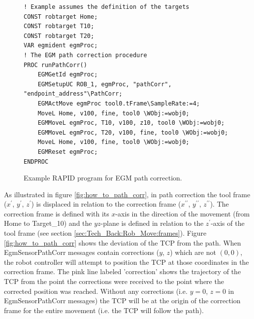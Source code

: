 \documentclass{cslthse-msc}
\begin{document}
\lstset{language=RAPID}
\begin{figure}[H]
    \centering
    \begin{lstlisting}
! Example assumes the definition of the targets
CONST robtarget Home;
CONST robtarget T10;
CONST robtarget T20;
VAR egmident egmProc;
! The EGM path correction procedure
PROC runPathCorr()
    EGMGetId egmProc;
    EGMSetupUC ROB_1, egmProc, "pathCorr", "endpoint_address"\PathCorr;
    EGMActMove egmProc tool0.tFrame\SampleRate:=4;
    MoveL Home, v100, fine, tool0 \WObj:=wobj0;
    EGMMoveL egmProc, T10, v100, z10, tool0 \WObj:=wobj0;
    EGMMoveL egmProc, T20, v100, fine, tool0 \WObj:=wobj0;
    MoveL Home, v100, fine, tool0 \WObj:=wobj0;
    EGMReset egmProc;
ENDPROC
\end{lstlisting}
\caption{Example RAPID program for EGM path correction.}
\label{fig:rapid_path_corr}
\end{figure}

As illustrated in figure \ref{fig:how_to_path_corr}, in path correction the tool frame ($x^{\prime}$, $y^{\prime}$, $z^{\prime}$) is displaced in relation to the correction frame ($x^{\prime\prime}$, $y^{\prime\prime}$, $z^{\prime\prime}$). The correction frame is defined with its $x$-axis in the direction of the movement (from Home to Target\_10) and the $yz$-plane is defined in relation to the $z^{\prime}$-axis of the tool frame (see section \ref{sec:Tech_Back:Rob_Move:frames}). Figure \ref{fig:how_to_path_corr} shows the deviation of the TCP from the path. When EgmSensorPathCorr messages contain corrections ($y$, $z$) which are not $(0,0)$, the robot controller will attempt to position the TCP at those coordinates in the correction frame. The pink line labeled 'correction' shows the trajectory of the TCP from the point the corrections were received to the point where the corrected position was reached. Without any corrections (i.e. $y=0$, $z=0$ in EgmSensorPathCorr messages) the TCP will be at the origin of the correction frame for the entire movement (i.e. the TCP will follow the path). 
\end{document}

